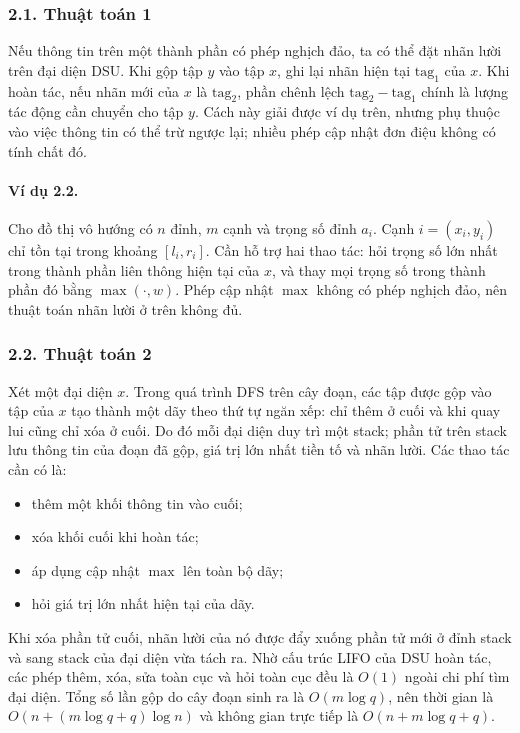 \documentclass[11pt]{article}
\begin{document}
\subsubsection*{2.1. Thuật toán 1}

Nếu thông tin trên một thành phần có phép nghịch đảo, ta có thể đặt nhãn lười
trên đại diện DSU. Khi gộp tập \(y\) vào tập \(x\), ghi lại nhãn hiện tại
\(\mathrm{tag}_1\) của \(x\). Khi hoàn tác, nếu nhãn mới của \(x\) là
\(\mathrm{tag}_2\), phần chênh lệch \(\mathrm{tag}_2-\mathrm{tag}_1\) chính là
lượng tác động cần chuyển cho tập \(y\). Cách này giải được ví dụ trên, nhưng
phụ thuộc vào việc thông tin có thể trừ ngược lại; nhiều phép cập nhật đơn điệu
không có tính chất đó.

\paragraph{Ví dụ 2.2.}
Cho đồ thị vô hướng có \(n\) đỉnh, \(m\) cạnh và trọng số đỉnh \(a_i\). Cạnh
\(i=(x_i,y_i)\) chỉ tồn tại trong khoảng \([l_i,r_i]\). Cần hỗ trợ hai thao
tác: hỏi trọng số lớn nhất trong thành phần liên thông hiện tại của \(x\), và
thay mọi trọng số trong thành phần đó bằng \(\max(\cdot,w)\). Phép cập nhật
\(\max\) không có phép nghịch đảo, nên thuật toán nhãn lười ở trên không đủ.

\subsubsection*{2.2. Thuật toán 2}

Xét một đại diện \(x\). Trong quá trình DFS trên cây đoạn, các tập được gộp vào
tập của \(x\) tạo thành một dãy theo thứ tự ngăn xếp: chỉ thêm ở cuối và khi
quay lui cũng chỉ xóa ở cuối. Do đó mỗi đại diện duy trì một stack; phần tử
trên stack lưu thông tin của đoạn đã gộp, giá trị lớn nhất tiền tố và nhãn
lười. Các thao tác cần có là:
\begin{itemize}
  \item thêm một khối thông tin vào cuối;
  \item xóa khối cuối khi hoàn tác;
  \item áp dụng cập nhật \(\max\) lên toàn bộ dãy;
  \item hỏi giá trị lớn nhất hiện tại của dãy.
\end{itemize}

Khi xóa phần tử cuối, nhãn lười của nó được đẩy xuống phần tử mới ở đỉnh stack
và sang stack của đại diện vừa tách ra. Nhờ cấu trúc LIFO của DSU hoàn tác, các
phép thêm, xóa, sửa toàn cục và hỏi toàn cục đều là \(O(1)\) ngoài chi phí tìm
đại diện. Tổng số lần gộp do cây đoạn sinh ra là \(O(m\log q)\), nên thời gian
là \(O(n+(m\log q+q)\log n)\) và không gian trực tiếp là
\(O(n+m\log q+q)\).
\end{document}
